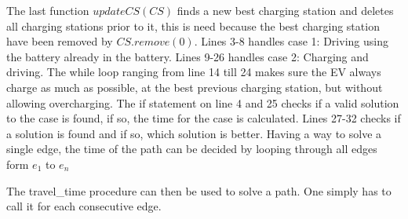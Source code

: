 The last function $updateCS(CS)$ finds a new best charging station and deletes all charging stations prior to it, this is need because the best charging station have been removed by $CS.remove(0)$. Lines 3-8 handles case 1: Driving using the battery already in the battery. Lines 9-26 handles case 2: Charging and driving. The while loop ranging from line 14 till 24 makes sure the EV always charge as much as possible, at the best previous charging station, but without allowing overcharging. The if statement on line 4 and 25 checks if a valid solution to the case is found, if so, the time for the case is calculated. Lines 27-32 checks if a solution is found and if so, which solution is better. Having a way to solve a single edge, the time of the path can be decided by looping through all edges form $e_1$ to $e_n$

The travel\_time procedure can then be used to solve a path. One simply has to call it for each consecutive edge.



